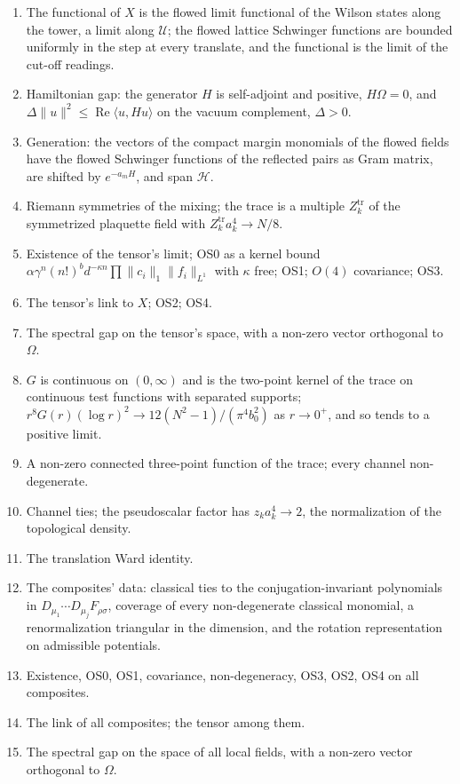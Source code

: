 \documentclass[10pt,letterpaper,twocolumn]{article}
\providecommand{\tightlist}{\setlength{\itemsep}{0pt}\setlength{\parskip}{0pt}}
\begin{document}
\begin{enumerate}
\def\labelenumi{\arabic{enumi}.}
\tightlist
\item
  The functional of \(X\) is the flowed limit functional of the Wilson states along the tower, a limit along \(\mathcal U\); the flowed lattice Schwinger functions are bounded uniformly in the step at every translate, and the functional is the limit of the cut-off readings.
\item
  Hamiltonian gap: the generator \(H\) is self-adjoint and positive, \(H\Omega=0\), and \(\Delta\|u\|^2\le\operatorname{Re}\langle u,Hu\rangle\) on the vacuum complement, \(\Delta>0\).
\item
  Generation: the vectors of the compact margin monomials of the flowed fields have the flowed Schwinger functions of the reflected pairs as Gram matrix, are shifted by \(e^{-a_mH}\), and span \(\mathcal H\).
\item
  Riemann symmetries of the mixing; the trace is a multiple \(Z^{\mathrm{tr}}_k\) of the symmetrized plaquette field with \(Z^{\mathrm{tr}}_ka_k^4\to N/8\).
\item
  Existence of the tensor's limit; OS0 as a kernel bound \(\alpha\gamma^n(n!)^bd^{-\kappa n}\prod\|c_i\|_1\|f_i\|_{L^1}\) with \(\kappa\) free; OS1; \(O(4)\) covariance; OS3.
\item
  The tensor's link to \(X\); OS2; OS4.
\item
  The spectral gap on the tensor's space, with a non-zero vector orthogonal to \(\Omega\).
\item
  \(G\) is continuous on \((0,\infty)\) and is the two-point kernel of the trace on continuous test functions with separated supports; \(r^8G(r)(\log r)^2\to12(N^2-1)/(\pi^4b_0^2)\) as \(r\to0^+\), and so tends to a positive limit.
\item
  A non-zero connected three-point function of the trace; every channel non-degenerate.
\item
  Channel ties; the pseudoscalar factor has \(z_ka_k^4\to2\), the normalization of the topological density.
\item
  The translation Ward identity.
\item
  The composites' data: classical ties to the conjugation-invariant polynomials in \(D_{\mu_1}\cdots D_{\mu_j}F_{\rho\sigma}\), coverage of every non-degenerate classical monomial, a renormalization triangular in the dimension, and the rotation representation on admissible potentials.
\item
  Existence, OS0, OS1, covariance, non-degeneracy, OS3, OS2, OS4 on all composites.
\item
  The link of all composites; the tensor among them.
\item
  The spectral gap on the space of all local fields, with a non-zero vector orthogonal to \(\Omega\).
\end{enumerate}
\end{document}
